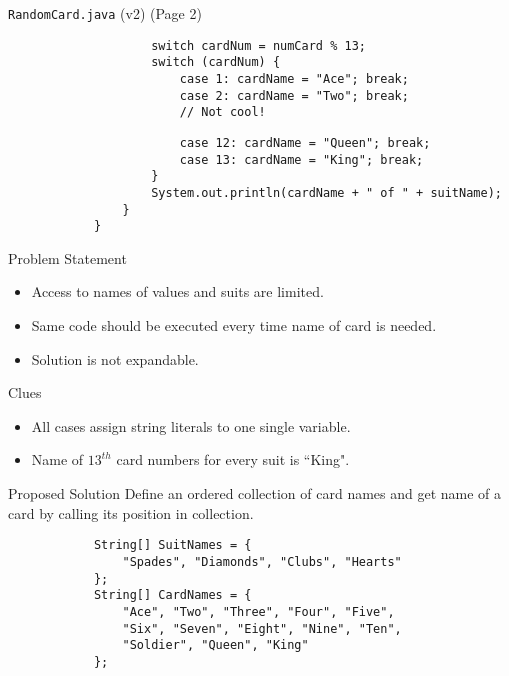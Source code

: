 \documentclass[10pt, compress]{beamer}
\begin{document}
\begin{slide}
	\begin{block}{\texttt{RandomCard.java} (v2) (Page 2)}
		\begin{verbatim}
			        switch cardNum = numCard % 13;
			        switch (cardNum) {
			            case 1: cardName = "Ace"; break;
			            case 2: cardName = "Two"; break;
			            // Not cool!
		\end{verbatim}
		\begin{verbatim}
			            case 12: cardName = "Queen"; break;
			            case 13: cardName = "King"; break;
			        }
			        System.out.println(cardName + " of " + suitName);
			    }
			}
		\end{verbatim}
	\end{block}
\end{slide}

\begin{slide}
	\begin{block}{Problem Statement}
		\begin{itemize}
			\item[] Access to names of values and suits are limited.
			\item[] Same code should be executed every time name of card is needed.
			\item[] Solution is not expandable.
		\end{itemize}
	\end{block}
	\begin{block}{Clues}
		\begin{itemize}
			\item[] All cases assign string literals to one single variable.
			\item[] Name of $13^{th}$ card numbers for every suit is ``King".
		\end{itemize}
	\end{block}
\end{slide}

\begin{slide}
	\begin{block}{Proposed Solution}
		Define an ordered collection of card names and get name of a card by calling its position in collection.
		\begin{verbatim}
			String[] SuitNames = {
			    "Spades", "Diamonds", "Clubs", "Hearts"
			};
			String[] CardNames = {
			    "Ace", "Two", "Three", "Four", "Five",
			    "Six", "Seven", "Eight", "Nine", "Ten",
			    "Soldier", "Queen", "King"
			};
		\end{verbatim}
	\end{block}
\end{slide}
\end{document}
